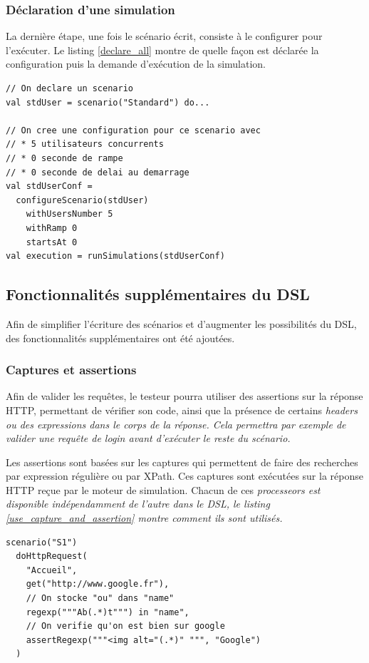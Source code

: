 \subsubsection{Déclaration d'une simulation}

La dernière étape, une fois le scénario écrit, consiste à le configurer pour l'exécuter. Le listing \ref{declare_all} montre de quelle façon est déclarée la configuration puis la demande d'exécution de la simulation.

\begin{lstlisting}[caption={Déclaration d'une simulation au complet},label={declare_all}]
// On declare un scenario
val stdUser = scenario("Standard") do...

// On cree une configuration pour ce scenario avec
// * 5 utilisateurs concurrents
// * 0 seconde de rampe
// * 0 seconde de delai au demarrage
val stdUserConf = 
  configureScenario(stdUser)
    withUsersNumber 5 
    withRamp 0
    startsAt 0
val execution = runSimulations(stdUserConf)
\end{lstlisting}

\subsection{Fonctionnalités supplémentaires du DSL}
Afin de simplifier l'écriture des scénarios et d'augmenter les possibilités du DSL, des fonctionnalités supplémentaires ont été ajoutées.

\subsubsection{Captures et assertions}
Afin de valider les requêtes, le testeur pourra utiliser des assertions sur la réponse HTTP, permettant de vérifier son code, ainsi que la présence de certains \em{headers} ou des expressions dans le corps de la réponse. Cela permettra par exemple de valider une requête de login avant d'exécuter le reste du scénario. 

Les assertions sont basées sur les captures qui permettent de faire des recherches par expression régulière ou par XPath. Ces captures sont exécutées sur la réponse HTTP reçue par le moteur de simulation. Chacun de ces \em{processeors} est disponible indépendamment de l'autre dans le DSL, le listing \ref{use_capture_and_assertion} montre comment ils sont utilisés.

\begin{lstlisting}[caption={Utilisation des captures et assertions},label={use_capture_and_assertion}]
scenario("S1")
  doHttpRequest(
    "Accueil",
    get("http://www.google.fr"),
    // On stocke "ou" dans "name"
    regexp("""Ab(.*)t""") in "name",
    // On verifie qu'on est bien sur google
    assertRegexp("""<img alt="(.*)" """, "Google")
  )
\end{lstlisting}

